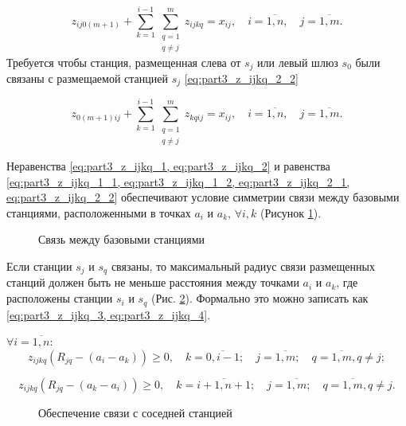 \begin{equation}
  \label{eq:part3_z_ijkq_2_1}
  z_{ij0(m+1)} + \sum\limits_{k=1}^{i-1} \sum\limits_{\substack{q = 1\\ q \neq j}}^m z_{ijkq}= x_{ij}, \quad i = \overline{1, n}, \quad j = \overline{1, m}.
\end{equation}
Требуется чтобы станция, размещенная слева от $s_j$ или левый шлюз $ s_{0} $  были связаны с размещаемой станцией $ s_j $ \cref{eq:part3_z_ijkq_2_2}

\begin{equation}
  \label{eq:part3_z_ijkq_2_2}
    z_{0(m+1)ij} +  \sum\limits_{k=1}^{i-1} \sum\limits_{\substack{q = 1 \\ q \neq j}}^m z_{kqij}= x_{ij},  \quad i = \overline{1, n}, \quad j = \overline{1, m}.
\end{equation}


Неравенства \cref{eq:part3_z_ijkq_1, eq:part3_z_ijkq_2} и равенства \cref{eq:part3_z_ijkq_1_1, eq:part3_z_ijkq_1_2, eq:part3_z_ijkq_2_1, eq:part3_z_ijkq_2_2} обеспечивают условие симметрии связи между базовыми станциями, расположенными в точках $ a_i $ и $ a_k $, $\forall i, k $ (Рисунок \cref{fig:part3_station_link}).

\begin{figure}[ht]
  \caption{Связь между базовыми станциями}\label{fig:part3_station_link}
\end{figure}

Если станции $ s_j $ и $ s_q $ связаны, то максимальный радиус связи размещенных станций должен быть не меньше расстояния между точками $ a_i $ и $ a_k $, где расположены станции $ s_i $ и $ s_q $ (Рис. \cref{fig:part3_station_link_between_points}). Формально это можно записать как \cref{eq:part3_z_ijkq_3, eq:part3_z_ijkq_4}.

 $\forall i= \overline{1,n}$:
\begin{equation}
  \label{eq:part3_z_ijkq_3}
  z_{ijkq}(R_{jq}-(a_i-a_k ))\geq 0, \quad k=\overline{0,i-1}; \quad j=\overline{1,m}; \quad q= \overline{1,m}, q \neq j; 
\end{equation}

\begin{equation}
  \label{eq:part3_z_ijkq_4}
  z_{ijkq} (R_{jq}-(a_k-a_i )) \geq 0, \quad k=\overline{i+1,n+1}; \quad j=\overline{1,m}; \quad q= \overline{1,m}, q \neq j.
\end{equation}

\begin{figure}[ht]
  \caption{Обеспечение связи с соседней станцией}\label{fig:part3_station_link_between_points}
\end{figure}

